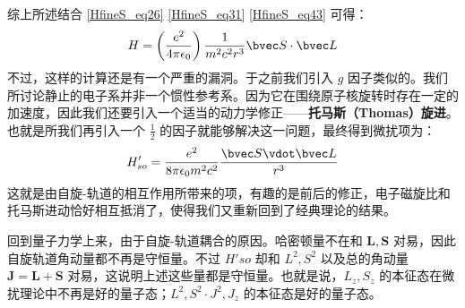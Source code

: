 综上所述结合 \autoref{HfineS_eq26} \autoref{HfineS_eq31} \autoref{HfineS_eq43} 可得：
\begin{equation}
H=\left(\frac{e^2}{4\pi\epsilon_0}\right)\frac{1}{m^2c^2r^3}\bvec S \cdot \bvec L
\end{equation}
不过，这样的计算还是有一个严重的漏洞。于之前我们引入 $g$ 因子类似的。我们所讨论静止的电子系并非一个惯性参考系。因为它在围绕原子核旋转时存在一定的加速度，因此我们还要引入一个适当的动力学修正——\textbf{托马斯（Thomas）旋进}。也就是所我们再引入一个 $\frac{1}{2}$ 的因子就能够解决这一问题，最终得到微扰项为：
\begin{equation}
H'_{so} = \frac{e^2}{8\pi \epsilon_0 m^2 c^2} \frac{\bvec S \vdot \bvec L}{r^3}
\end{equation}
这就是由自旋-轨道的相互作用所带来的项，有趣的是前后的修正，电子磁旋比和托马斯进动恰好相互抵消了，使得我们又重新回到了经典理论的结果。

回到量子力学上来，由于自旋-轨道耦合的原因。哈密顿量不在和 $\mathbf{L,S}$ 对易，因此自旋轨道角动量都不再是守恒量。不过 $H'{so}$ 却和 $L^2,S^2$ 以及总的角动量 $\mathbf{J=L+S}$ 对易，这说明上述这些量都是守恒量。也就是说，$L_z,S_z$ 的本征态在微扰理论中不再是好的量子态；$L^2,S^2\cdot J^2,J_z$ 的本征态是好的量子态。

